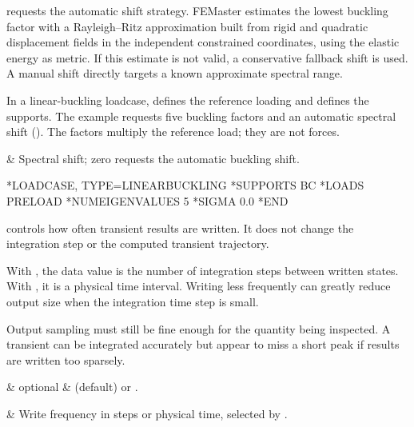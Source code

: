  requests the automatic shift strategy. FEMaster estimates the lowest buckling factor with a Rayleigh--Ritz approximation built from rigid and quadratic displacement fields in the independent constrained coordinates, using the elastic energy as metric. If this estimate is not valid, a conservative fallback shift is used. A manual shift directly targets a known approximate spectral range.

In a linear-buckling loadcase,  defines the reference
loading and  defines the supports. The example requests five
buckling factors and an automatic spectral shift ().
The factors multiply the reference load; they are not forces.

\begin{keyworddata}
 & Spectral shift; zero requests the automatic buckling shift. \\
\end{keyworddata}

\exampleheading
\begin{inputdeck}
*LOADCASE, TYPE=LINEARBUCKLING
*SUPPORTS
BC
*LOADS
PRELOAD
*NUMEIGENVALUES
5
*SIGMA
0.0
*END
\end{inputdeck}


 controls how often transient results are written. It does not change the integration step or the computed transient trajectory.

With , the data value is the number of integration steps between written states. With , it is a physical time interval. Writing less frequently can greatly reduce output size when the integration time step is small.

Output sampling must still be fine enough for the quantity being inspected. A transient can be integrated accurately but appear to miss a short peak if results are written too sparsely.

\begin{keywordparameters}
 & optional &  (default) or . \\
\end{keywordparameters}

\begin{keyworddata}
 & Write frequency in steps or physical time, selected by . \\
\end{keyworddata}

